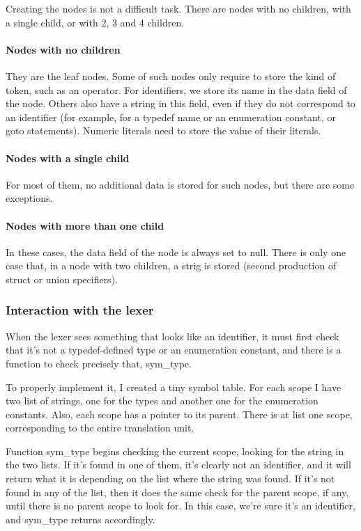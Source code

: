 \documentclass[a4paper,openany]{article}
\begin{document}
Creating the nodes is not a difficult task. There are nodes with no children, with a single child, or with 2, 3 and 4 children.

\paragraph{Nodes with no children}
They are the leaf nodes. Some of such nodes only require to store the kind of token, such as an operator. For identifiers, we store its name in the data field of the node. Others also have a string in this field, even if they do not correspond to an identifier (for example, for a typedef name or an enumeration constant, or goto statements). Numeric literals need to store the value of their literals.

\paragraph{Nodes with a single child}
For most of them, no additional data is stored for such nodes, but there are some exceptions.

\paragraph{Nodes with more than one child}
In these cases, the data field of the node is always set to null. There is only one case that, in a node with two children, a strig is stored (second production of struct or union specifiers).

\subsubsection{Interaction with the lexer}
When the lexer sees something that looks like an identifier, it must first check that it's not a typedef-defined type or an enumeration constant, and there is a function to check precisely that, sym\_type.

To properly implement it, I created a tiny symbol table. For each scope I have two list of strings, one for the types and another one for the enumeration constants. Also, each scope has a pointer to its parent. There is at list one scope, corresponding to the entire translation unit.

Function sym\_type begins checking the current scope, looking for the string in the two lists. If it's found in one of them, it's clearly not an identifier, and it will return what it is depending on the list where the string was found. If it's not found in any of the list, then it does the same check for the parent scope, if any, until there is no parent scope to look for. In this case, we're sure it's an identifier, and sym\_type returns accordingly.
\end{document}
